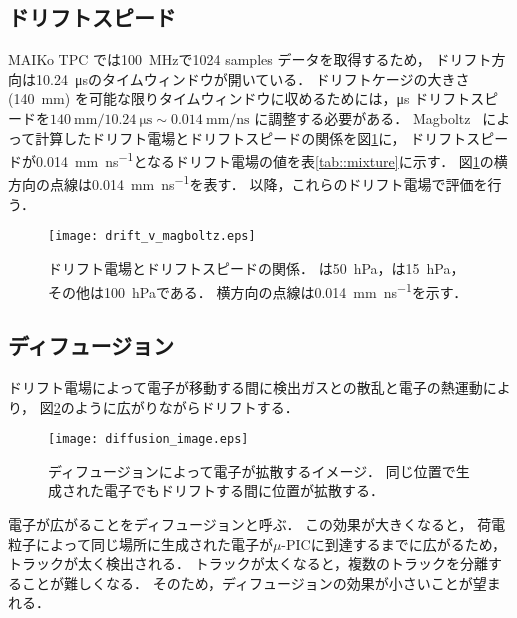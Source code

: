 \documentclass[../master]{subfiles}
\begin{document}
\subsection{ドリフトスピード}
MAIKo TPC では\SI{100}{\mega\hertz}で1024 samples データを取得するため，
ドリフト方向は\SI{10.24}{\micro\second}のタイムウィンドウが開いている．
ドリフトケージの大きさ (\SI{140}{\milli\metre}) を可能な限りタイムウィンドウに収めるためには，\si{\micro\second}
ドリフトスピードを$\SI{140}{\milli\metre}/\SI{10.24}{\micro\second} \sim \SI{0.014}{\milli\metre\per\nano\second}$
に調整する必要がある．
Magboltz~\cite{magboltz} によって計算したドリフト電場とドリフトスピードの関係を図\ref{fig::drift_v_magboltz}に，
ドリフトスピードが\SI{0.014}{\milli\metre\per\nano\second}となるドリフト電場の値を表\ref{tab::mixture}に示す．
図\ref{fig::drift_v_magboltz}の横方向の点線は\SI{0.014}{\milli\metre\per\nano\second}を表す．
以降，これらのドリフト電場で評価を行う．
\begin{figure}
  \centering
  \texttt{[image: drift\_v\_magboltz.eps]}
  \caption[ドリフト電場とドリフトスピードの関係．]
          {ドリフト電場とドリフトスピードの関係．
            \Methane は\SI{50}{\hecto\pascal}，\isoButane は\SI{15}{\hecto\pascal}，その他は\SI{100}{\hecto\pascal}である．
          横方向の点線は\SI{0.014}{\milli\metre\per\nano\second}を示す．}
  \label{fig::drift_v_magboltz}
\end{figure}

\subsection{ディフュージョン}
ドリフト電場によって電子が移動する間に検出ガスとの散乱と電子の熱運動により，
図\ref{fig::diffusion-image}のように広がりながらドリフトする．
\begin{figure}
  \centering
  \texttt{[image: diffusion\_image.eps]}
  \caption[ディフュージョンによって電子が拡散するイメージ．]
          {ディフュージョンによって電子が拡散するイメージ．
          同じ位置で生成された電子でもドリフトする間に位置が拡散する．}
  \label{fig::diffusion-image}
\end{figure}
電子が広がることをディフュージョンと呼ぶ．
この効果が大きくなると，
荷電粒子によって同じ場所に生成された電子が$\mu$-PICに到達するまでに広がるため，
トラックが太く検出される．
トラックが太くなると，複数のトラックを分離することが難しくなる．
そのため，ディフュージョンの効果が小さいことが望まれる．
\end{document}
